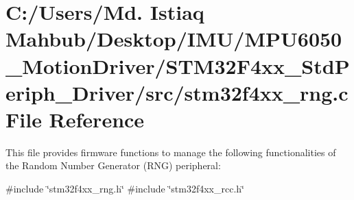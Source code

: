 \section{C\+:/\+Users/\+Md. Istiaq Mahbub/\+Desktop/\+I\+M\+U/\+M\+P\+U6050\+\_\+\+Motion\+Driver/\+S\+T\+M32\+F4xx\+\_\+\+Std\+Periph\+\_\+\+Driver/src/stm32f4xx\+\_\+rng.c File Reference}
\label{stm32f4xx__rng_8c}


This file provides firmware functions to manage the following functionalities of the Random Number Generator (R\+NG) peripheral\+:  


{\ttfamily \#include \char`\"{}stm32f4xx\+\_\+rng.\+h\char`\"{}}\newline
{\ttfamily \#include \char`\"{}stm32f4xx\+\_\+rcc.\+h\char`\"{}}\newline
